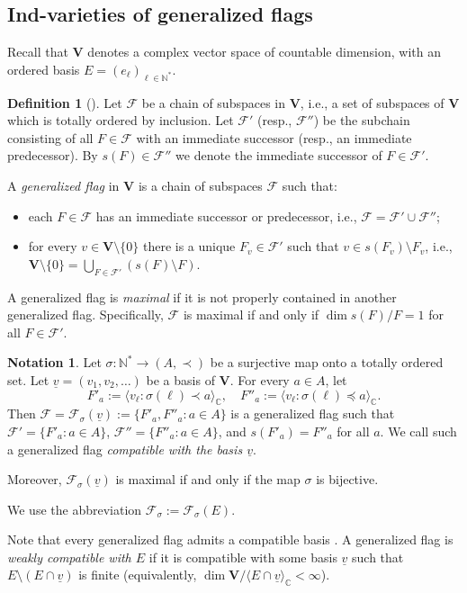 \documentclass{amsart}
\theoremstyle{definition}
\newtheorem{definition}{Definition}
\newtheorem{notation}{Notation}
\newcommand{\NN}{\mathbb{N}^*}
\begin{document}
\subsection{Ind-varieties of generalized flags}

\label{S2.3}

Recall that $\mathbf{V}$ denotes a complex vector space of countable dimension,
with an ordered basis $E=(e_\ell)_{\ell\in\NN}$.

\begin{definition}[\cite{Dimitrov-Penkov}]
Let $\mathcal{F}$ be a chain of subspaces in $\mathbf{V}$, i.e., a set of subspaces of $\mathbf{V}$ which is totally ordered by inclusion. Let $\mathcal{F}'$ (resp., $\mathcal{F}''$) be the subchain consisting of all $F\in\mathcal{F}$ with an immediate successor (resp., an immediate predecessor).
By $s(F)\in\mathcal{F}''$ we denote the immediate successor of $F\in\mathcal{F}'$.

A {\em generalized flag} in $\mathbf{V}$ is a chain of subspaces $\mathcal{F}$ such that:
\begin{itemize}
\item[\rm (i)] each $F\in\mathcal{F}$ has an immediate successor or predecessor,
i.e., $\mathcal{F}=\mathcal{F}'\cup\mathcal{F}''$;
\item[\rm (ii)] for every $v\in\mathbf{V}\setminus\{0\}$ there is a unique $F_v\in\mathcal{F}'$ such that $v\in s(F_v)\setminus F_v$, i.e.,
$\mathbf{V}\setminus\{0\}=\bigcup_{F\in\mathcal{F}'}(s(F)\setminus F)$.
\end{itemize}

A generalized flag is {\em maximal} if it is not properly contained in another generalized flag.
Specifically, $\mathcal{F}$ is maximal if and only if $\dim s(F)/F=1$ for all $F\in\mathcal{F}'$.
\end{definition}

\begin{notation}
Let $\sigma:\NN\to (A,\prec)$ be a surjective map onto a totally ordered set.
Let $\underline{v}=(v_1,v_2,\ldots)$ be a basis of $\mathbf{V}$.
For every $a\in A$, let 
\[F'_a:=\langle v_\ell:\sigma(\ell)\prec a\rangle_\mathbb{C},\quad 
F''_a:=\langle v_\ell:\sigma(\ell)\preceq a\rangle_\mathbb{C}.\]
Then $\mathcal{F}=\mathcal{F}_\sigma(\underline{v}):=\{F'_a,F''_a:a\in A\}$ is a generalized flag such that
$\mathcal{F}'=\{F'_a:a\in A\}$, $\mathcal{F}''=\{F''_a:a\in A\}$, and $s(F'_a)=F''_a$ for all $a$.
We call such a generalized flag {\em compatible with the basis $\underline{v}$}.

Moreover, $\mathcal{F}_\sigma(\underline{v})$ is maximal if and only if the map $\sigma$ is bijective.

We use the abbreviation $\mathcal{F}_\sigma:=\mathcal{F}_\sigma(E)$.

Note that every generalized flag admits a compatible basis \cite[Proposition 4.1]{Dimitrov-Penkov}.
A generalized flag is {\em weakly compatible with $E$} if it is compatible with some basis $\underline{v}$ such that $E\setminus(E\cap \underline{v})$ is finite (equivalently, $\dim\mathbf{V}/\langle E\cap \underline{v}\rangle_\mathbb{C}<\infty$).
\end{notation}
\end{document}
